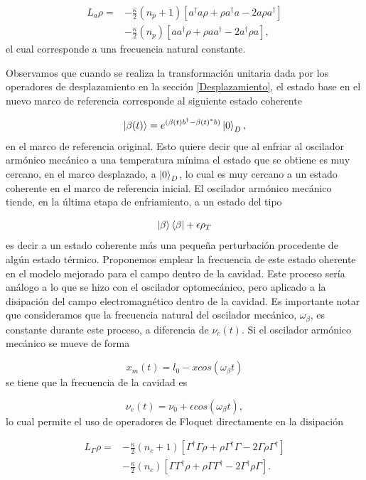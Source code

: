 \documentclass[10pt,a4paper]{report}
\begin{document}
\begin{align}
L_a \rho =& - \frac{\kappa}{2}(n_p + 1)[a^\dagger a\rho + \rho a^\dagger a -2a\rho a^\dagger]  \\
 &- \frac{\kappa}{2}(n_p)[ aa^\dagger\rho + \rho  aa^\dagger -2a^\dagger\rho a],\nonumber
\end{align} 
el cual corresponde a una frecuencia natural constante.

Observamos que cuando se realiza la transformación unitaria
dada por los operadores de desplazamiento en la sección \ref{Desplazamiento}, el estado base en el nuevo marco de referencia corresponde al siguiente estado coherente

\begin{equation}
\Ket{\beta(t)} = e^{(\beta(t) b^\dagger - \beta(t)^*b)} \Ket{0}_D,
\end{equation}
en el marco de referencia original. Esto quiere decir que al enfriar
al oscilador armónico mecánico a una temperatura mínima el estado que
se obtiene es muy cercano, en el marco desplazado, a $\Ket{0}_D$, lo
cual es muy cercano a un estado coherente en el marco de referencia
inicial. El oscilador armónico mecánico
tiende, en la última etapa de enfriamiento, a un estado del tipo


\begin{equation}
\Ket{\beta}\Bra{\beta} + \epsilon\rho_T
\end{equation} 
es decir a un estado coherente más una pequeña perturbación procedente
de algún estado térmico. Proponemos emplear la frecuencia de este estado oherente en el modelo mejorado para el campo dentro de la cavidad.
Este proceso sería análogo a lo que se hizo con el oscilador
optomecánico, pero aplicado a la disipación del campo electromagnético dentro de la
cavidad. Es importante notar que consideramos que la
  frecuencia natural del oscilador mecánico, $\omega_\beta$, es constante
durante este proceso, a diferencia de $\nu_c(t)$. Si el oscilador
armónico mecánico se mueve de forma

\begin{equation}
x_m(t) = l_0 - xcos(\omega_\beta t)
\end{equation} se tiene que la frecuencia de la cavidad es

\begin{equation}
\nu_c(t) = \nu_0 + \epsilon cos(\omega_\beta t),
\end{equation} lo cual permite el uso de operadores de Floquet directamente en la disipación 

\begin{align}
L_\Gamma \rho =& - \frac{\kappa}{2}(n_c + 1)[\Gamma^\dagger \Gamma\rho + \rho \Gamma^\dagger \Gamma -2\Gamma\rho \Gamma^\dagger]  \\
 &- \frac{\kappa}{2}(n_c)[ \Gamma\Gamma^\dagger\rho + \rho  \Gamma\Gamma^\dagger -2\Gamma^\dagger\rho \Gamma].\nonumber
\end{align}
\end{document}

